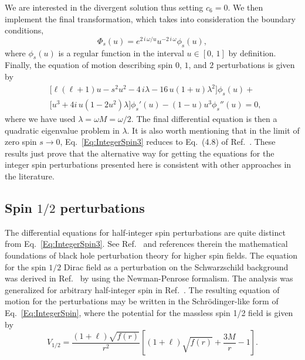 %
We are interested in the divergent solution thus setting $c_6=0$. We then implement the final transformation, which takes into consideration the boundary conditions,
%
\begin{equation}\label{Eq:FinalTrans}
  \Phi_{s}(u)=e^{2\,i\,\omega/u}u^{-2\,i\,\omega}\phi_{s}(u),
\end{equation}
%
where $\phi_{s}(u)$ is a regular function in the interval $u\in[0,\,1]$ by definition. Finally, the equation of motion describing spin $0$, $1$, and $2$ perturbations is given by
%
\begin{equation}\label{Eq:IntegerSpin3}
  \begin{split}
    &\!\!\Big[\ell\left(\ell+1\right) u -s^2u^2-4\,i\lambda-16\,u\left(1+u\right)\lambda^2\Big]\phi_{s}(u)+\\
    & \!\!\Big[u^3+4i\,u\left(1-2u^2\right)\lambda\Big]\phi_{s}'(u)-(1-u)u^3\phi_{s}''(u)=0,
  \end{split}
\end{equation}
%
where we have used $\lambda=\omega M=\omega/2$. The final differential equation is then a quadratic eigenvalue problem in $\lambda$. It is also worth mentioning that in the limit of zero spin $s\to 0$, Eq.~\eqref{Eq:IntegerSpin3} reduces to Eq.~(4.8) of Ref.~\cite{qnmspectral}. These results just prove that the alternative way for getting the equations for the integer spin perturbations presented here is consistent with other approaches in the literature.

\subsection{Spin $1/2$ perturbations}

The differential equations for half-integer spin perturbations are quite distinct from Eq.~\eqref{Eq:IntegerSpin3}. See Ref.~\cite{Chandrasekhar1998-le} and references therein the mathematical foundations of black hole perturbation theory for higher spin fields. The equation for the spin $1/2$ Dirac field as a perturbation on the Schwarzschild background was derived in Ref.~\cite{Cho:2003qe} by using the Newman-Penrose formalism. The analysis was generalized for arbitrary half-integer spin in Ref.~\cite{Shu:2005fw}. The resulting equation of motion for the perturbations may be written in the Schr\"odinger-like form of Eq.~\eqref{Eq:IntegerSpin}, where the potential for the massless spin 1/2 field is given by
%
\begin{equation}\label{eq:pot-s12}
  V_{\scriptscriptstyle{1/2}}= \frac{\left(1+\ell\right)\sqrt{f(r)}}{r^{2}} \left[\left(1+\ell\right)\sqrt{f(r)}+\frac{3M}{r}-1\right].
\end{equation}

